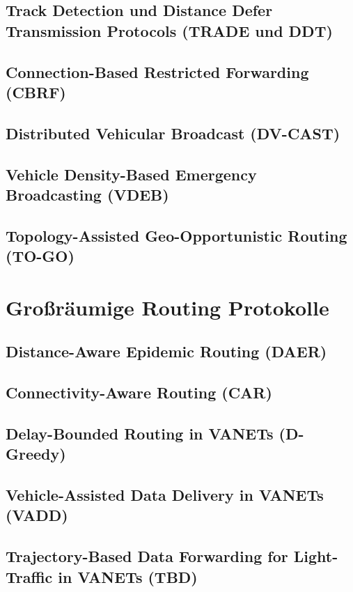 \documentclass[english,runningheads,a4paper]{llncs}[2018/03/10]
\begin{document}
\subsection{Track Detection und Distance Defer Transmission Protocols (TRADE und DDT)}

\subsection{Connection-Based Restricted Forwarding (CBRF)}

\subsection{Distributed Vehicular Broadcast (DV-CAST)}

\subsection{Vehicle Density-Based Emergency Broadcasting (VDEB)}

\subsection{Topology-Assisted Geo-Opportunistic Routing (TO-GO)}

\section{Großräumige Routing Protokolle}
\label{sec:smallscaleprotocols}

\subsection{Distance-Aware Epidemic Routing (DAER)}
\subsection{Connectivity-Aware Routing (CAR)}

\subsection{Delay-Bounded Routing in VANETs (D-Greedy)}
\subsection{Vehicle-Assisted Data Delivery in VANETs (VADD)}
\subsection{Trajectory-Based Data Forwarding for Light-Traffic in VANETs (TBD)}
\end{document}
